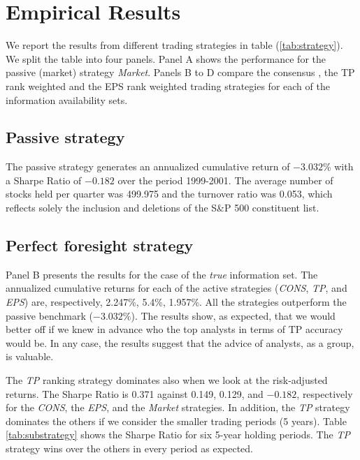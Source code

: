 \documentclass{article}\usepackage[]{graphicx}\usepackage[]{color}
\newcommand{\tr}{\textit{true}}
\begin{document}

\section{Empirical Results}
\label{sec:results}

We report the results from different trading strategies in table (\ref{tab:strategy}). We split the table into four panels. Panel A shows  the performance for  the passive (market) strategy \textit{Market}. Panels B to D compare the consensus , the TP rank weighted and the EPS rank weighted trading strategies for each of the information availability sets. 


\subsection{Passive strategy}

The passive strategy generates an annualized cumulative return of \ensuremath{-3.032}\% with a Sharpe Ratio  of \ensuremath{-0.182} over the period 1999-2001. The average number of stocks held per quarter was 499.975 and the turnover ratio was 0.053, which reflects solely the inclusion and deletions  of the S\&P 500 constituent list.

\subsection{Perfect foresight strategy}
\label{sec:perfect}
Panel B presents the results for the case of the \tr{} information set. The annualized cumulative returns for each of the active strategies (\textit{CONS}, \textit{TP}, and \textit{EPS}) are, respectively, 2.247\%, 5.4\%, 1.957\%. All the strategies outperform the passive benchmark (\ensuremath{-3.032}\%). The results show, as expected, that  we would better off if we knew in advance who the top analysts in terms of TP accuracy would be. In any case, the results suggest that the advice of analysts, as a group, is valuable. 


The \textit{TP} ranking strategy dominates also when we look at the risk-adjusted returns. The Sharpe Ratio is 0.371 against 0.149, 0.129, and \ensuremath{-0.182}, respectively for the \textit{CONS}, the \textit{EPS}, and the \textit{Market} strategies. In addition, the \textit{TP} strategy dominates  the others if we consider the smaller trading periods (5 years). Table \ref{tab:substrategy} shows the Sharpe Ratio for six 5-year holding periods. The \textit{TP} strategy wins over the others in every period as expected.
\end{document}
